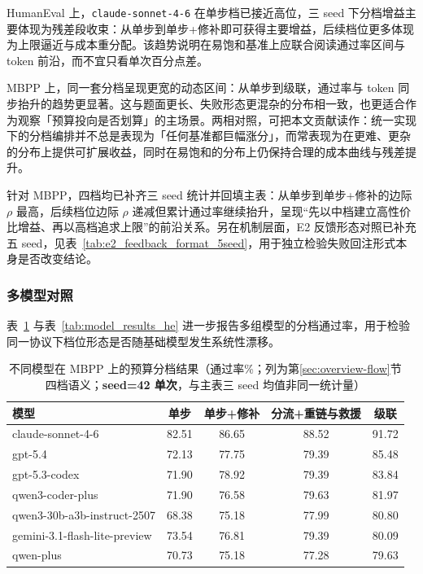 HumanEval 上，\texttt{claude-sonnet-4-6} 在单步档已接近高位，三 seed 下分档增益主要体现为残差段收束：从单步到单步+修补即可获得主要增益，后续档位更多体现为上限逼近与成本重分配。该趋势说明在易饱和基准上应联合阅读通过率区间与 token 前沿，而不宜只看单次百分点差。

MBPP 上，同一套分档呈现更宽的动态区间：从单步到级联，通过率与 token 同步抬升的趋势更显著。这与题面更长、失败形态更混杂的分布相一致，也更适合作为观察「预算投向是否划算」的主场景。两相对照，可把本文贡献读作：统一实现下的分档编排并不总是表现为「任何基准都巨幅涨分」，而常表现为在更难、更杂的分布上提供可扩展收益，同时在易饱和的分布上仍保持合理的成本曲线与残差提升。

针对 MBPP，四档均已补齐三 seed 统计并回填主表：从单步到单步+修补的边际 $\rho$ 最高，后续档位边际 $\rho$ 递减但累计通过率继续抬升，呈现“先以中档建立高性价比增益、再以高档追求上限”的前沿关系。另在机制层面，E2 反馈形态对照已补充五 seed，见表~\ref{tab:e2_feedback_format_5seed}，用于独立检验失败回注形式本身是否改变结论。

\subsubsection{多模型对照}

表~\ref{tab:model_results_mbpp} 与表~\ref{tab:model_results_he} 进一步报告多组模型的分档通过率，用于检验同一协议下档位形态是否随基础模型发生系统性漂移。

\begin{table}[htbp]
\centering
\caption{不同模型在 MBPP 上的预算分档结果（通过率\%；列为第\ref{sec:overview-flow}节四档语义；\textbf{seed=42 单次}，与主表三 seed 均值非同一统计量）}
\label{tab:model_results_mbpp}
\begin{tabular}{lcccc}
\toprule
模型 & 单步 & 单步+修补 & 分流+重链与救援 & 级联 \\
\midrule
claude-sonnet-4-6 & 82.51 & 86.65 & 88.52 & 91.72 \\
gpt-5.4 & 72.13 & 77.75 & 79.39 & 85.48 \\
gpt-5.3-codex & 71.90 & 78.92 & 79.39 & 83.84 \\
qwen3-coder-plus & 71.90 & 76.58 & 79.63 & 81.97 \\
qwen3-30b-a3b-instruct-2507 & 68.38 & 75.18 & 77.99 & 80.80 \\
gemini-3.1-flash-lite-preview & 73.54 & 76.81 & 79.39 & 80.09 \\
qwen-plus & 70.73 & 75.18 & 77.28 & 79.63 \\
\bottomrule
\end{tabular}
\end{table}

